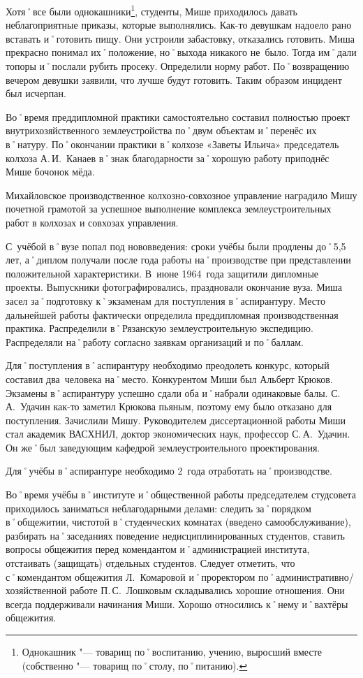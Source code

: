 Хотя˚все были однокашники\footnote{Однокашник "--- товарищ по˚воспитанию, учению, выросший вместе (собственно "--- товарищ по˚столу, по˚питанию).}, студенты, Мише приходилось давать неблагоприятные приказы, которые выполнялись. Как-то девушкам надоело рано вставать и˚готовить пищу. Они устроили забастовку, отказались готовить. Миша прекрасно понимал их˚положение, но˚выхода никакого не~было. Тогда им˚дали топоры и˚послали рубить просеку. Определили норму работ. По˚возвращению вечером девушки заявили, что лучше будут готовить. Таким образом инцидент был исчерпан. 

Во˚время преддипломной практики самостоятельно составил полностью проект внутрихозяйственного землеустройства по˚двум объектам и˚перенёс их в˚натуру. По˚окончании практики в˚колхозе «Заветы Ильича» председатель колхоза А.\,И.~Канаев в˚знак благодарности за˚хорошую работу приподнёс Мише бочонок мёда.

Михайловское производственное колхозно-совхозное управление наградило Мишу почетной грамотой за успешное выполнение комплекса землеустроительных работ в колхозах и совхозах управления.

С~учёбой в˚вузе попал под нововведения: сроки учёбы были продлены до˚5,5 лет, а˚диплом получали после года работы на˚производстве при представлении положительной характеристики. В~июне 1964~года защитили дипломные проекты. Выпускники фотографировались, праздновали окончание вуза. Миша засел за˚подготовку к˚экзаменам для поступления в˚аспирантуру. Место дальнейшей работы фактически определила преддипломная производственная практика. Распределили в˚Рязанскую землеустроительную экспедицию. Распределяли на˚работу согласно заявкам организаций и по˚баллам.

Для˚поступления в˚аспирантуру необходимо преодолеть конкурс, который составил два~человека на˚место. Конкурентом Миши был Альберт Крюков. Экзамены в˚аспирантуру успешно сдали оба и˚набрали одинаковые балы. С.\,А.~Удачин как-то заметил Крюкова пьяным, поэтому ему было отказано для поступления. Зачислили Мишу. Руководителем диссертационной работы Миши стал академик ВАСХНИЛ, доктор экономических наук, профессор С.\,А.~Удачин. Он же˚был заведующим кафедрой землеустроительного проектирования.

Для˚учёбы в˚аспирантуре необходимо 2~года отработать на˚производстве.

Во˚время учёбы в˚институте и˚общественной работы председателем студсовета приходилось заниматься неблагодарными делами: следить за˚порядком в˚общежитии, чистотой в˚студенческих комнатах (введено самообслуживание), разбирать на˚заседаниях поведение недисциплинированных студентов, ставить вопросы общежития перед комендантом и˚администрацией института, отстаивать (защищать) отдельных студентов. Следует отметить, что с˚комендантом общежития Л.~Комаровой и˚проректором по˚административно\-/хозяйственной работе П.\,С.~Лошковым складывались хорошие отношения. Они всегда поддерживали начинания Миши. Хорошо относились к˚нему и˚вахтёры общежития.

